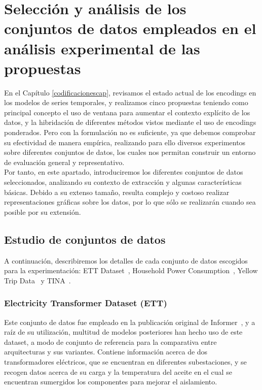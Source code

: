 \chapter{Selección y análisis de los conjuntos de datos empleados en el análisis experimental de las propuestas}

En el Capítulo \ref{codificacionescap}, revisamos el estado actual de los encodings en los modelos de series temporales, y realizamos cinco propuestas teniendo como principal concepto el uso de ventana para aumentar el contexto explícito de los datos, y la hibridación de diferentes métodos vistos mediante el uso de encodings ponderados. Pero con la formulación no es suficiente, ya que debemos comprobar su efectividad de manera empírica, realizando para ello diversos experimentos sobre diferentes conjuntos de datos, los cuales nos permitan construir un entorno de evaluación general y representativo.\\

Por tanto, en este apartado, introduciremos los diferentes conjuntos de datos seleccionados, analizando su contexto de extracción y algunas características básicas. Debido a su extenso tamaño, resulta complejo y costoso realizar representaciones gráficas sobre los datos, por lo que sólo se realizarán cuando sea posible por su extensión.

\section{Estudio de conjuntos de datos}

A continuación, describiremos los detalles de cada conjunto de datos escogidos para la experimentación: ETT Dataset~\cite{zhou2021etdataset}, Household Power Consumption~\cite{hebrail2006individual}, Yellow Trip Data~\cite{nycopendata} y TINA~\cite{tina_dasci_arcelor}.

\subsection{Electricity Transformer Dataset (ETT)}

Este conjunto de datos fue empleado en la publicación original de Informer~\cite{zhou2021informerefficienttransformerlong}, y a raíz de su utilización, multitud de modelos posteriores han hecho uso de este dataset, a modo de conjunto de referencia para la comparativa entre arquitecturas y sus variantes. Contiene información acerca de dos transformadores eléctricos, que se encuentran en diferentes subestaciones, y se recogen datos acerca de su carga y la temperatura del aceite en el cual se encuentran sumergidos los componentes para mejorar el aislamiento.\\

